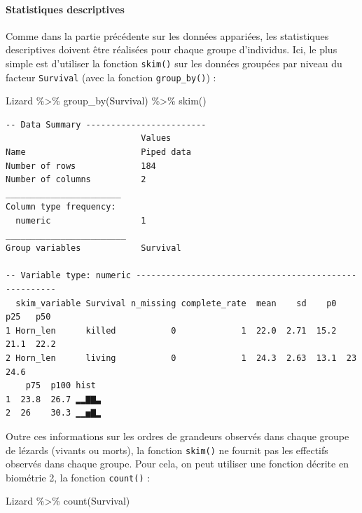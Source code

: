 \documentclass[
  a4paper,
]{article}
\newenvironment{Shaded}{\begin{snugshade}}{\end{snugshade}}
\newcommand{\FunctionTok}[1]{\textcolor[rgb]{0.39,0.29,0.61}{#1}}
\newcommand{\NormalTok}[1]{\textcolor[rgb]{0.12,0.11,0.11}{#1}}
\newcommand{\SpecialCharTok}[1]{\textcolor[rgb]{0.24,0.68,0.91}{#1}}
\begin{document}
\hypertarget{statistiques-descriptives-2}{%
\paragraph{Statistiques descriptives}\label{statistiques-descriptives-2}}

Comme dans la partie précédente sur les données appariées, les statistiques descriptives doivent être réalisées pour chaque groupe d'individus. Ici, le plus simple est d'utiliser la fonction \texttt{skim()} sur les données groupées par niveau du facteur \texttt{Survival} (avec la fonction \texttt{group\_by()}) :

\begin{Shaded}
\begin{Highlighting}[]
\NormalTok{Lizard }\SpecialCharTok{\%\textgreater{}\%} 
  \FunctionTok{group\_by}\NormalTok{(Survival) }\SpecialCharTok{\%\textgreater{}\%} 
  \FunctionTok{skim}\NormalTok{()}
\end{Highlighting}
\end{Shaded}

\begin{verbatim}
-- Data Summary ------------------------
                           Values    
Name                       Piped data
Number of rows             184       
Number of columns          2         
_______________________              
Column type frequency:               
  numeric                  1         
________________________             
Group variables            Survival  

-- Variable type: numeric ------------------------------------------------------
  skim_variable Survival n_missing complete_rate  mean    sd    p0   p25   p50
1 Horn_len      killed           0             1  22.0  2.71  15.2  21.1  22.2
2 Horn_len      living           0             1  24.3  2.63  13.1  23    24.6
    p75  p100 hist 
1  23.8  26.7 ▂▂▇▇▃
2  26    30.3 ▁▁▅▇▂
\end{verbatim}

Outre ces informations sur les ordres de grandeurs observés dans chaque groupe de lézards (vivants ou morts), la fonction \texttt{skim()} ne fournit pas les effectifs observés dans chaque groupe. Pour cela, on peut utiliser une fonction décrite en biométrie 2, la fonction \texttt{count()} :

\begin{Shaded}
\begin{Highlighting}[]
\NormalTok{Lizard }\SpecialCharTok{\%\textgreater{}\%} 
  \FunctionTok{count}\NormalTok{(Survival)}
\end{Highlighting}
\end{Shaded}
\end{document}
